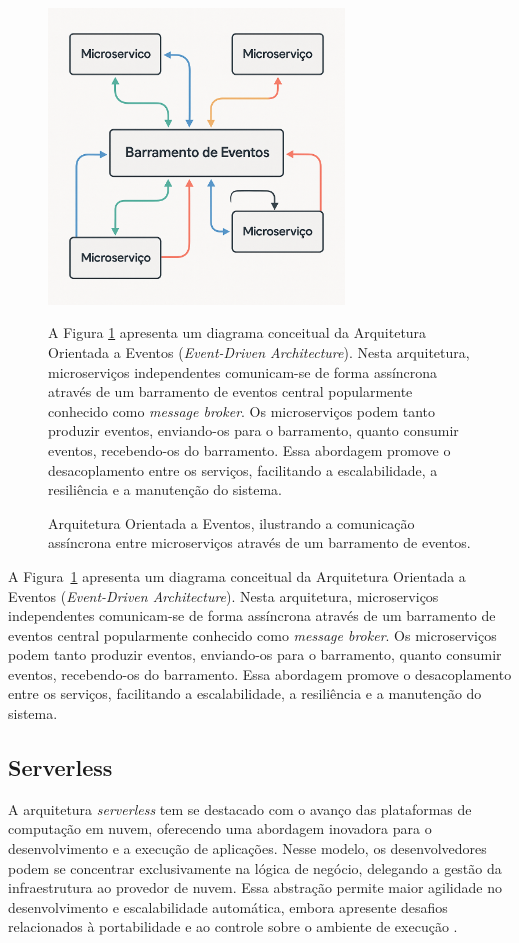 \begin{figure}[H]
    \centering
    \includegraphics[width=0.7\textwidth]{images/event-driven.png}
    \caption{Arquitetura Orientada a Eventos, ilustrando a comunicação assíncrona entre microserviços através de um barramento de eventos.}
    \label{fig:event-driven}
    \parbox{\textwidth}{
        A Figura \ref{fig:event-driven} apresenta um diagrama conceitual da Arquitetura Orientada a Eventos (\textit{Event-Driven Architecture}). Nesta arquitetura, microserviços independentes comunicam-se de forma assíncrona através de um barramento de eventos central popularmente conhecido como \textit{message broker}. Os microserviços podem tanto produzir eventos, enviando-os para o barramento, quanto consumir eventos, recebendo-os do barramento. Essa abordagem promove o desacoplamento entre os serviços, facilitando a escalabilidade, a resiliência e a manutenção do sistema.
    }
\end{figure}

A Figura~\ref{fig:event-driven} apresenta um diagrama conceitual da Arquitetura Orientada a Eventos (\textit{Event-Driven Architecture}). Nesta arquitetura, microserviços independentes comunicam-se de forma assíncrona através de um barramento de eventos central popularmente conhecido como \textit{message broker}. Os microserviços podem tanto produzir eventos, enviando-os para o barramento, quanto consumir eventos, recebendo-os do barramento. Essa abordagem promove o desacoplamento entre os serviços, facilitando a escalabilidade, a resiliência e a manutenção do sistema.

\subsection{Serverless}
A arquitetura \textit{serverless} tem se destacado com o avanço das plataformas de computação em nuvem, oferecendo uma abordagem inovadora para o desenvolvimento e a execução de aplicações. Nesse modelo, os desenvolvedores podem se concentrar exclusivamente na lógica de negócio, delegando a gestão da infraestrutura ao provedor de nuvem. Essa abstração permite maior agilidade no desenvolvimento e escalabilidade automática, embora apresente desafios relacionados à portabilidade e ao controle sobre o ambiente de execução \cite{shekhar2023microservices}.

